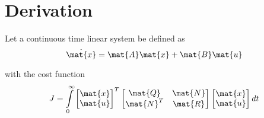 \section{Derivation}

Let a continuous time linear \gls{system} be defined as
\begin{equation}
  \dot{\mat{x}} = \mat{A}\mat{x} + \mat{B}\mat{u}
\end{equation}

with the cost function
\begin{equation*}
  J = \int\limits_0^\infty
    \begin{bmatrix}
      \mat{x} \\
      \mat{u}
    \end{bmatrix}^T
    \begin{bmatrix}
      \mat{Q} & \mat{N} \\
      \mat{N}^T & \mat{R}
    \end{bmatrix}
    \begin{bmatrix}
      \mat{x} \\
      \mat{u}
    \end{bmatrix} dt
\end{equation*}

